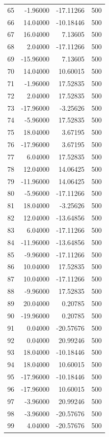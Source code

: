 \begin{longtable}{rrrr}
65 & -1.96000 & -17.11266 & 500 \\
66 & 14.04000 & -10.18446 & 500 \\
67 & 16.04000 & 7.13605 & 500 \\
68 & 2.04000 & -17.11266 & 500 \\
69 & -15.96000 & 7.13605 & 500 \\
70 & 14.04000 & 10.60015 & 500 \\
71 & -1.96000 & 17.52835 & 500 \\
72 & 2.04000 & 17.52835 & 500 \\
73 & -17.96000 & -3.25626 & 500 \\
74 & -5.96000 & 17.52835 & 500 \\
75 & 18.04000 & 3.67195 & 500 \\
76 & -17.96000 & 3.67195 & 500 \\
77 & 6.04000 & 17.52835 & 500 \\
78 & 12.04000 & 14.06425 & 500 \\
79 & -11.96000 & 14.06425 & 500 \\
80 & -5.96000 & -17.11266 & 500 \\
81 & 18.04000 & -3.25626 & 500 \\
82 & 12.04000 & -13.64856 & 500 \\
83 & 6.04000 & -17.11266 & 500 \\
84 & -11.96000 & -13.64856 & 500 \\
85 & -9.96000 & -17.11266 & 500 \\
86 & 10.04000 & 17.52835 & 500 \\
87 & 10.04000 & -17.11266 & 500 \\
88 & -9.96000 & 17.52835 & 500 \\
89 & 20.04000 & 0.20785 & 500 \\
90 & -19.96000 & 0.20785 & 500 \\
91 & 0.04000 & -20.57676 & 500 \\
92 & 0.04000 & 20.99246 & 500 \\
93 & 18.04000 & -10.18446 & 500 \\
94 & 18.04000 & 10.60015 & 500 \\
95 & -17.96000 & -10.18446 & 500 \\
96 & -17.96000 & 10.60015 & 500 \\
97 & -3.96000 & 20.99246 & 500 \\
98 & -3.96000 & -20.57676 & 500 \\
99 & 4.04000 & -20.57676 & 500 \\
\bottomrule
\end{longtable}


